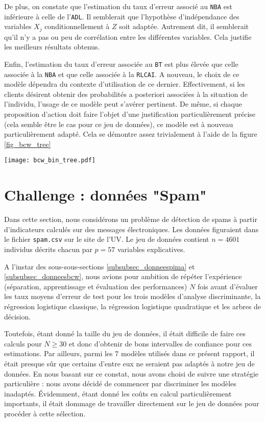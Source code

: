 \documentclass{article}
\begin{document}
\begin{multicols}{2}
De plus, on constate que l'estimation du taux d'erreur associé au \texttt{NBA} est inférieure à celle de l'\texttt{ADL}. Il semblerait que l'hypothèse d'indépendance des variables $X_j$ conditionnellement à $Z$ soit adaptée. Autrement dit, il semblerait qu'il n'y a pas ou peu de corrélation entre les différentes variables. Cela justifie les meilleurs résultats obtenus. 

Enfin, l'estimation du taux d'erreur associée au \texttt{BT} est plus élevée que celle associée à la \texttt{NBA} et que celle associée à la \texttt{RLCAI}. A nouveau, le choix de ce modèle dépendra du contexte d'utilisation de ce dernier. Effectivement, si les clients désirent obtenir des probabilités a posteriori associées à la situation de l'individu, l'usage de ce modèle peut s'avérer pertinent. De même, si chaque proposition d'action doit faire l'objet d'une justification particulièrement précise (cela semble être le cas pour ce jeu de données), ce modèle est à nouveau particulièrement adapté. Cela se démontre assez trivialement à l'aide de la figure \ref{fig_bcw_tree}

\begingroup
   \centering
   \texttt{[image: bcw\_bin\_tree.pdf]}
    \label{fig_bcw_tree}
\endgroup

\section{Challenge : données "Spam"}
\label{sec_challenge}
Dans cette section, nous considérons un problème de détection de spams à partir d'indicateurs calculés sur des messages électroniques. Les données figuraient dans le fichier \texttt{spam.csv} sur le site de l'UV. Le jeu de données contient $n = 4601$ individus décrits chacun par $p = 57$ variables explicatives.

A l'instar des sous-sous-sections \ref{subsubsec_donneespima} et \ref{subsubsec_donneesbcw}, nous avions pour ambition de répéter l'expérience (séparation, apprentissage et évaluation des performances) $N$ fois avant d'évaluer les taux moyens d'erreur de test pour les trois modèles d'analyse discriminante, la régression logistique classique, la régression logistique quadratique et les arbres de décision.

Toutefois, étant donné la taille du jeu de données, il était difficile de faire ces calculs pour $N \geq 30$ et donc d'obtenir de bons intervalles de confiance pour ces estimations. Par ailleurs, parmi les $7$ modèles utilisés dans ce présent rapport, il était presque sûr que certains d'entre eux ne seraient pas adaptés à notre jeu de données. En nous basant sur ce constat, nous avons choisi de suivre une stratégie particulière : nous avons décidé de commencer par discriminer les modèles inadaptés. Évidemment, étant donné les coûts en calcul particulièrement importants, il était dommage de travailler directement sur le jeu de données pour procéder à cette sélection.


\end{multicols}
\end{document}
